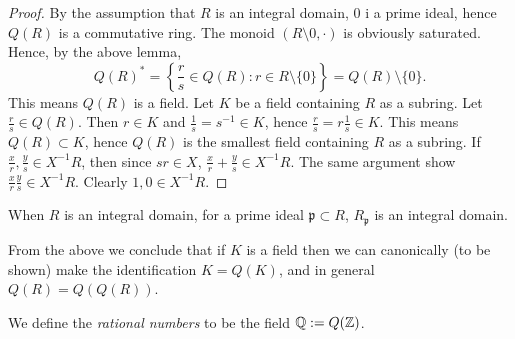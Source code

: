 \begin{proof}
    By the assumption that $R$ is an integral domain, $0$ i a prime ideal, hence $Q(R)$ is a commutative ring. The monoid $(R\setminus0, \cdot)$ is obviously saturated. Hence, by the above lemma,
    $$Q(R)^\ast = \left\{ \frac{r}{s}\in Q(R) : r\in R\setminus\{0\} \right\} = Q(R)\setminus\{0\}.$$
    This means $Q(R)$ is a field. Let $K$ be a field containing $R$ as a subring. Let $\frac{r}{s}\in Q(R)$. Then $r \in K$ and $\frac{1}{s}=s^{-1} \in K$, hence $\frac{r}{s} = r \frac{1}{s} \in K$. This means $Q(R) \subset K$, hence $Q(R)$ is the smallest field containing $R$ as a subring. If $\frac{x}{r},\frac{y}{s}\in X^{-1}R$, then since $sr\in X$, $\frac{x}{r}+\frac{y}{s}\in X^{-1}R$. The same argument show $\frac{x}{r}\frac{y}{s}\in X^{-1}R$. Clearly $1,0\in X^{-1}R$.
\end{proof}
\begin{corollary}
    When $R$ is an integral domain, for a prime ideal $\mathfrak{p}\subset R$,  $R_\mathfrak{p}$ is an integral domain. 
\end{corollary}
\begin{remark}
    From the above we conclude that if $K$ is a field then we can canonically (to be shown) make the identification $K = Q(K)$, and in general $Q(R) =  Q(Q(R))$.
\end{remark}
\begin{definition}
    We define the \textit{rational numbers} to be the field $\mathbb{Q} := Q(\mathbb{Z})$.
\end{definition}

